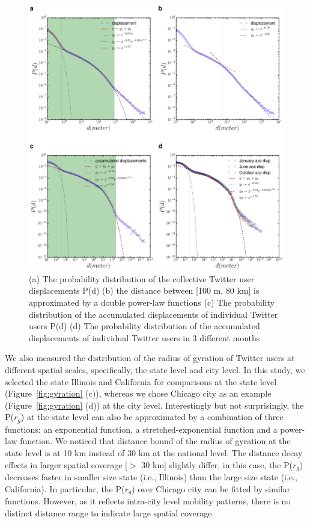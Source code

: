 \documentclass[ijgi,article,submit,moreauthors,pdftex,10pt,a4paper]{mdpi}
\theoremstyle{mdpi}
\newcounter{ex}
\newcounter{re}
\theoremstyle{mdpidefinition}
\providecommand{\DIFaddbegin}{} %
\providecommand{\DIFdelbegin}{} %
\providecommand{\DIFdelend}{} %
\providecommand{\DIFaddendFL}{} %
\begin{document}
\DIFdelbegin %
\DIFdelend \DIFaddbegin \begin{figure}[ht]
\DIFaddendFL \centering
\includegraphics[width=1.0\linewidth]{./figures/displacement}
\caption{(a) The probability distribution of the collective Twitter user displacements P(d) (b) the distance between [100 m, 80 km] is approximated by a double power-law functions (c) The probability distribution of the accumulated displacements of individual Twitter users P(d) (d) The probability distribution of the accumulated displacements of individual Twitter users in 3 different months}
\label{fig:displacement}
\end{figure}
\FloatBarrier

We also measured the distribution of the radius of gyration of Twitter users at different spatial scales, specifically, the state level and city level.
In this study, we selected the state Illinois and California for comparisons at the state level (Figure~\ref{fig:gyration} (c)), whereas we chose Chicago city as an example (Figure~\ref{fig:gyration} (d)) at the city level.
Interestingly but not surprisingly, the P($r_{g}$) at the state level can also be approximated by a combination of three functions: an exponential function, a stretched-exponential function and a power-law function.
We noticed that distance bound of the radius of gyration at the state level is at 10 km instead of 30 km at the national level.
The distance decay effects in larger spatial coverage [$>$ 30 km] slightly differ, in this case, the P($r_{g}$) decreases faster in smaller size state (i.e., Illinois) than the large size state (i.e., California).
In particular, the P($r_{g}$) over Chicago city can be fitted by similar functions.
However, as it reflects intra-city level mobility patterns, there is no distinct distance range to indicate large spatial coverage.
\end{document}
